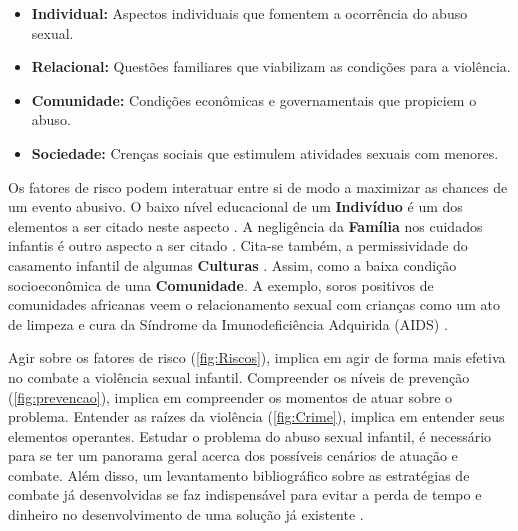 \begin{itemize}
  \item \textbf{Individual:} \hfill Aspectos individuais que fomentem a ocorrência do abuso sexual. %
  \item \textbf{Relacional:} \hfill Questões familiares que viabilizam as condições para a violência.  %
  \item \textbf{Comunidade:} Condições econômicas e governamentais que propiciem o abuso.
  \item \textbf{Sociedade:} \hfill Crenças sociais que estimulem atividades sexuais com menores. 
\end{itemize}


Os fatores de risco podem interatuar entre si de modo a maximizar as chances de um evento abusivo. O baixo nível educacional de um \textbf{Indivíduo} é um dos elementos a ser citado neste aspecto \cite{dahlberg2006violencia}. A negligência da \textbf{Família} nos cuidados infantis é outro aspecto a ser citado \cite{blasco2018abuso}. Cita-se também, a permissividade do casamento infantil de algumas \textbf{Culturas} \cite{bandiera2017women}. Assim, como a baixa condição socioeconômica de uma \textbf{Comunidade}. A exemplo, soros positivos de comunidades africanas veem o relacionamento sexual com crianças como um ato de limpeza e cura da Síndrome da Imunodeficiência Adquirida (AIDS) \cite{aded2006abuso}.



Agir sobre os fatores de risco (\autoref{fig:Riscos}), implica em agir de forma mais efetiva no combate a violência sexual infantil. Compreender os níveis de prevenção (\autoref{fig:prevencao}), implica em compreender os momentos de atuar sobre o problema. Entender as raízes da violência (\autoref{fig:Crime}), implica em entender seus elementos operantes. Estudar o problema do abuso sexual infantil, é necessário para se ter um panorama geral acerca dos possíveis cenários de atuação e combate. Além disso, um levantamento bibliográfico sobre as estratégias de combate já desenvolvidas se faz indispensável para evitar a perda de tempo e dinheiro no desenvolvimento de uma solução já existente \cite{wazlawick2014metodologia}. 

